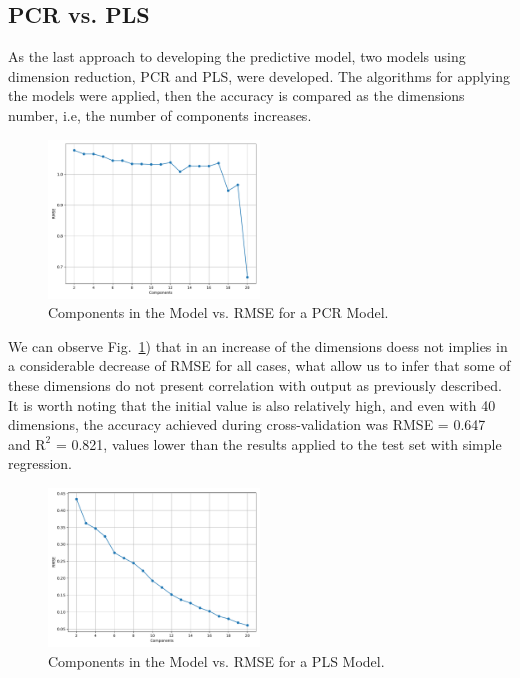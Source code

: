 \subsection{PCR vs. PLS}

As the last approach to developing the predictive model, two models using dimension reduction, PCR and PLS, were developed. The algorithms for applying the models were applied, then the accuracy is compared as the dimensions number, i.e, the number of components increases.

\begin{figure}[htbp!]
  \centerline{\includegraphics[width=0.5\textwidth]{../../code/hw2/figures/5-PCR-RMSE.pdf}}
  \caption{Components in the Model vs. RMSE for a PCR Model.}
  \label{fig:5-PCR-RMSE}
\end{figure}

We can observe Fig.~\ref{fig:5-PCR-RMSE}) that in an increase of the dimensions doess not implies in a considerable decrease of RMSE for all cases, what allow us to infer that some of these dimensions do not present correlation with output as previously described. It is worth noting that the initial value is also relatively high, and even with 40 dimensions, the accuracy achieved during cross-validation was RMSE = 0.647 and $\text{R}^2$ = 0.821, values lower than the results applied to the test set with simple regression. 

\begin{figure}[htbp!]
  \centerline{\includegraphics[width=0.5\textwidth]{../../code/hw2/figures/5-PLS-RMSE.pdf}}
  \caption{Components in the Model vs. RMSE for a PLS Model.}
  \label{fig:5-PLS-RMSE}
\end{figure}

